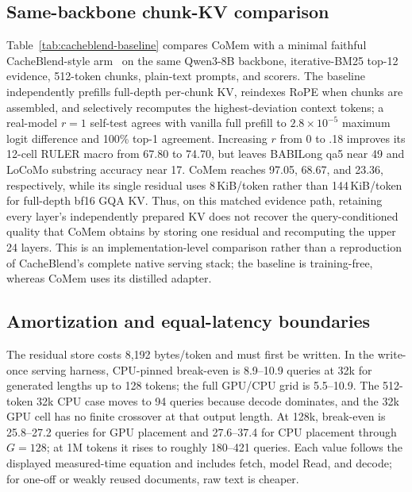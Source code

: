 \subsection{Same-backbone chunk-KV comparison}


Table~\ref{tab:cacheblend-baseline} compares CoMem with a minimal faithful
CacheBlend-style arm~\citep{cacheblend} on the same Qwen3-8B backbone,
iterative-BM25 top-12 evidence, 512-token chunks, plain-text prompts, and
scorers. The baseline independently prefills full-depth per-chunk KV, reindexes
RoPE when chunks are assembled, and selectively recomputes the highest-deviation
context tokens; a real-model $r{=}1$ self-test agrees with vanilla full prefill
to $2.8\!\times\!10^{-5}$ maximum logit difference and 100\% top-1 agreement.
Increasing $r$ from 0 to .18 improves its 12-cell RULER macro from 67.80 to
74.70, but leaves BABILong qa5 near 49 and LoCoMo substring accuracy near 17.
CoMem reaches 97.05, 68.67, and 23.36, respectively, while its single residual
uses 8\,KiB/token rather than 144\,KiB/token for full-depth bf16 GQA KV. Thus,
on this matched evidence path, retaining every layer's independently prepared
KV does not recover the query-conditioned quality that CoMem obtains by storing
one residual and recomputing the upper 24 layers. This is an implementation-level
comparison rather than a reproduction of CacheBlend's complete native serving
stack; the baseline is training-free, whereas CoMem uses its distilled adapter.

\subsection{Amortization and equal-latency boundaries}


The residual store costs 8,192 bytes/token and must first be written. In the
write-once serving harness, CPU-pinned break-even is 8.9--10.9 queries at 32k
for generated lengths up to 128 tokens; the full GPU/CPU grid is 5.5--10.9.
The 512-token 32k CPU case moves to 94 queries because decode dominates, and
the 32k GPU cell has no finite crossover at that output length. At 128k,
break-even is 25.8--27.2 queries for GPU placement and 27.6--37.4 for CPU
placement through $G{=}128$; at 1M tokens it rises to roughly 180--421 queries.
Each value follows the displayed measured-time equation and includes fetch,
model Read, and decode; for one-off or weakly reused documents, raw text is
cheaper.

